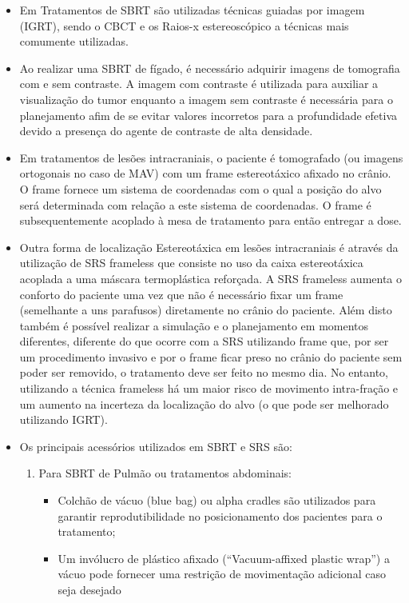 \documentclass[11pt,a4paper]{article}
\newcounter{exemplo}
\begin{document}
\begin{exemplo}
\begin{itemize}
        \item Em Tratamentos de SBRT são utilizadas técnicas guiadas por imagem (IGRT), sendo o CBCT e os Raios-x estereoscópico a técnicas mais comumente utilizadas.
        
        \item Ao realizar uma SBRT de fígado, é necessário adquirir imagens de tomografia com e sem contraste. A imagem com contraste é utilizada para auxiliar a visualização do tumor enquanto a imagem sem contraste é necessária para o planejamento afim de se evitar valores incorretos para a profundidade efetiva devido a presença do agente de contraste de alta densidade. 
        
        \item Em tratamentos de lesões intracraniais, o paciente é tomografado (ou imagens ortogonais no caso de MAV) com um frame estereotáxico afixado no crânio. O frame fornece um sistema de coordenadas com o qual a posição do alvo será determinada com relação a este sistema de coordenadas. O frame é subsequentemente acoplado à mesa de tratamento para então entregar a dose. 
        
        \item Outra forma de localização Estereotáxica em lesões intracraniais é através da utilização de SRS frameless que consiste no uso da caixa estereotáxica acoplada a uma máscara termoplástica reforçada. A SRS frameless aumenta o conforto do paciente uma vez que não é necessário fixar um frame (semelhante a uns parafusos) diretamente no crânio do paciente. Além disto também é possível realizar a simulação e o planejamento em momentos diferentes, diferente do que ocorre com  a SRS utilizando frame que, por ser um procedimento invasivo e por o frame ficar preso no crânio do paciente sem poder ser removido, o tratamento deve ser feito no mesmo dia. No entanto, utilizando a técnica frameless há um maior risco de movimento intra-fração e um aumento na incerteza da localização do alvo (o que pode ser melhorado utilizando IGRT).
        
        \item Os principais acessórios utilizados em SBRT e SRS são:
        
            \begin{enumerate}[label=\textcolor{CarnationPink}{\alph*)}]
                \item Para SBRT de Pulmão ou tratamentos abdominais:
                    \begin{itemize}[label=\textcolor{CarnationPink}{$\blacktriangleright$}]
                        \item Colchão de vácuo (blue bag) ou alpha cradles são utilizados para garantir reprodutibilidade no posicionamento dos pacientes para o tratamento;
                        \item Um invólucro de plástico afixado (``Vacuum-affixed plastic wrap'') a vácuo pode fornecer uma restrição de movimentação adicional caso seja desejado
                    \end{itemize}


\end{enumerate}
\end{itemize}
\end{exemplo}
\end{document}
